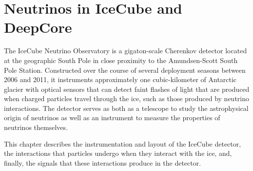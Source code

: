 \setchapterpreamble[u]{\margintoc}
\chapter{Neutrinos in IceCube and DeepCore}

The IceCube Neutrino Observatory is a gigaton-scale Cherenkov detector located at the geographic South Pole in close proximity to the Amundsen-Scott South Pole Station. Constructed over the course of several deployment seasons between 2006 and 2011, it instruments approximately one cubic-kilometer of Antarctic glacier with optical sensors that can detect faint flashes of light that are produced when charged particles travel through the ice, such as those produced by neutrino interactions. The detector serves as both as a telescope to study the astrophysical origin of neutrinos as well as an instrument to measure the properties of neutrinos themselves.

This chapter describes the instrumentation and layout of the IceCube detector, the interactions that particles undergo when they interact with the ice, and, finally, the signals that these interactions produce in the detector.







% 
% 
